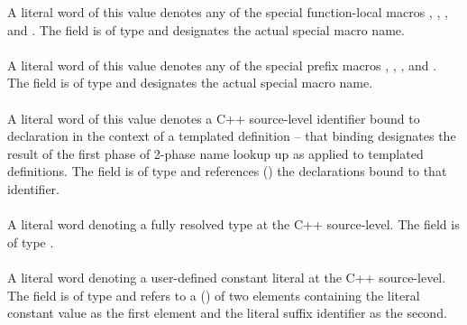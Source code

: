 A literal word of this value denotes any of the special function-local 
macros , , , and .
The  field is of type  and designates the actual special macro name.


\paragraph{}  
\label{sec:ifc:SourceLiteral:MsvcStringPrefixMacro}

A literal word of this value denotes any of the special prefix macros
, , , and .
The  field is of type  and designates the actual
special macro name.


\paragraph{}  
\label{sec:ifc:SourceLiteral:MsvcBinding}

A literal word of this value denotes a C++ source-level identifier bound to 
declaration in the context of a templated definition -- that binding designates
the result of the first phase of 2-phase name lookup up as applied to 
templated definitions.   The  field is of type 
and references () the declarations bound 
to that identifier.

\paragraph{}  
\label{sec:ifc:SourceLiteral:MsvcResolvedType}

A literal word denoting a fully resolved type at the C++ source-level.  The
 field is of type .

\paragraph{}  
\label{sec:ifc:SourceLiteral:MsvcDefinedConstant}

A literal word denoting a user-defined constant literal at the C++ source-level.
The  field is of type  and refers to a
() of two elements containing the literal constant
value as the first element and the literal suffix identifier as the second.

